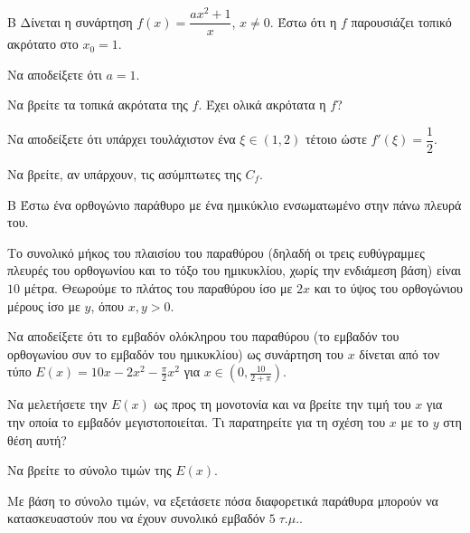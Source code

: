 \begin{thema}{Β}
Δίνεται η συνάρτηση $f(x) = \dfrac{ax^2+1}{x}$, $x\neq0$. Έστω ότι η $f$ παρουσιάζει τοπικό ακρότατο στο $x_0=1$.
\begin{erwthma}
  \item Να αποδείξετε ότι $a=1$.
  \item Να βρείτε τα τοπικά ακρότατα της $f$. Έχει ολικά ακρότατα η $f$?
  \item Να αποδείξετε ότι υπάρχει τουλάχιστον ένα $\xi \in (1, 2)$ τέτοιο ώστε $f'(\xi) = \dfrac{1}{2}$.
  \item Να βρείτε, αν υπάρχουν, τις ασύμπτωτες της $C_f$.
\end{erwthma}
\end{thema}

\begin{thema}{Β}
Έστω ένα ορθογώνιο παράθυρο με ένα ημικύκλιο ενσωματωμένο στην πάνω πλευρά του.
\begin{center}
\end{center}
Το συνολικό μήκος του πλαισίου του παραθύρου (δηλαδή οι τρεις ευθύγραμμες πλευρές του ορθογωνίου και το τόξο του ημικυκλίου, χωρίς την ενδιάμεση βάση) είναι $10$ μέτρα. Θεωρούμε το πλάτος του παραθύρου ίσο με $2x$ και το ύψος του ορθογώνιου μέρους ίσο με $y$, όπου $x, y > 0$.
\begin{erwthma}
  \item Να αποδείξετε ότι το εμβαδόν ολόκληρου του παραθύρου (το εμβαδόν του ορθογωνίου συν το εμβαδόν του ημικυκλίου) ως συνάρτηση του $x$ δίνεται από τον τύπο $E(x) = 10x - 2x^2 - \frac{\pi}{2}x^2$ για $x \in \left(0, \frac{10}{2+\pi}\right)$.
  \item Να μελετήσετε την $E(x)$ ως προς τη μονοτονία και να βρείτε την τιμή του $x$ για την οποία το εμβαδόν μεγιστοποιείται. Τι παρατηρείτε για τη σχέση του $x$ με το $y$ στη θέση αυτή?
  \item Να βρείτε το σύνολο τιμών της $E(x)$.
  \item Με βάση το σύνολο τιμών, να εξετάσετε πόσα διαφορετικά παράθυρα μπορούν να κατασκευαστούν που να έχουν συνολικό εμβαδόν $5 \; \tau.\mu.$.
\end{erwthma}
\end{thema}

